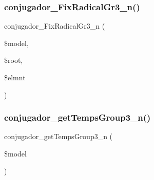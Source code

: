\subsubsection{\texorpdfstring{conjugador\+\_\+\+Fix\+Radical\+Gr3\+\_\+n()}{conjugador\_FixRadicalGr3\_n()}}
{\footnotesize\ttfamily conjugador\+\_\+\+Fix\+Radical\+Gr3\+\_\+n (\begin{DoxyParamCaption}\item[{}]{\$model,  }\item[{}]{\$root,  }\item[{}]{\$elmnt }\end{DoxyParamCaption})}

\hypertarget{conjugador__gr3__n_8inc_a3dfa66bbf35eab81453e7b9f5882de50}{}\label{conjugador__gr3__n_8inc_a3dfa66bbf35eab81453e7b9f5882de50} 
\subsubsection{\texorpdfstring{conjugador\+\_\+get\+Temps\+Group3\+\_\+n()}{conjugador\_getTempsGroup3\_n()}}
{\footnotesize\ttfamily conjugador\+\_\+get\+Temps\+Group3\+\_\+n (\begin{DoxyParamCaption}\item[{}]{\$model }\end{DoxyParamCaption})}

